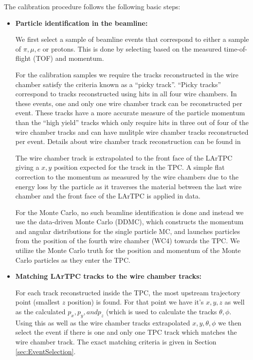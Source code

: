 The calibration procedure follows the following basic steps:
\begin{itemize}

\item \textbf{Particle identification in the beamline:}

We first select a sample of beamline events that correspond to either a sample of $\pi, \mu, e$ or protons. This is done by selecting based on the measured time-of-flight (TOF) and momentum. 

For the calibration samples we require the tracks reconstructed in the wire chamber satisfy the criteria known as a ``picky track''. ``Picky tracks'' correspond to tracks reconstructed using hits in all four wire chambers. In these events, one and only one wire chamber track can be reconstructed per event. These tracks have a more accurate measure of the particle momentum than the ``high yield'' tracks which only require hits in three out of four of the wire chamber tracks and can have mulitple wire chamber tracks reconstructed per event. Details about wire chamber track reconstruction can be found in \cite{WCTrackReco}

The wire chamber track is extrapolated to the front face of the LArTPC giving a $x, y$ position expected for the track in the TPC. A simple flat correction to the momentum as measured by the wire chambers due to the  energy loss by the particle as it traverses the material between the last wire chamber and the front face of the LArTPC is applied in data. 

For the Monte Carlo, no such beamline identification is done and instead we use the data-driven Monte Carlo (DDMC), which constructs the momentum and angular distributions for the single particle MC, and launches particles from the position of the fourth wire chamber (WC4) towards the TPC. We utilize the Monte Carlo truth for the position and momentum of the Monte Carlo particles as they enter the TPC.

\item \textbf{Matching LArTPC tracks to the wire chamber tracks:}

For each track reconstructed inside the TPC, the most upstream trajectory point (smallest $z$ position) is found. For that point we have it's $x, y, z$ as well as the calculated $p_{x}, p_{y}, and p_{z}$ (which is used to calculate the tracks $\theta, \phi$. Using this as well as the wire chamber tracks extrapolated $x, y, \theta, \phi$ we then select the event if there is one and only one TPC track which matches the wire chamber track. The exact matching criteria is given in Section \ref{sec:EventSelection}.


\end{itemize}
